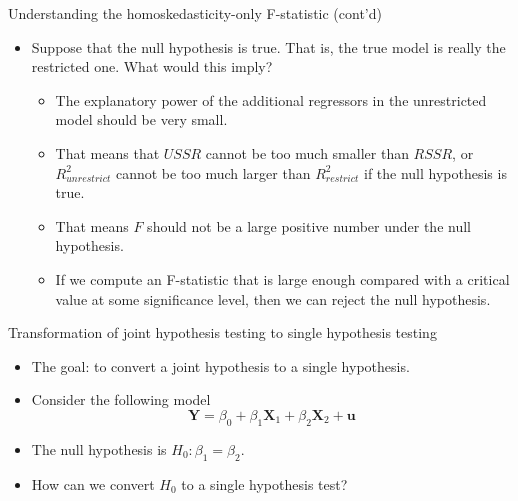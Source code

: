 \documentclass[presentation,10pt]{beamer}
\begin{document}
\begin{frame}[label={sec:org6815421}]{Understanding the homoskedasticity-only F-statistic (cont'd)}
\begin{itemize}
\item Suppose that the null hypothesis is true. That is, the
true model is really the restricted one. What would this imply?

\begin{itemize}
\item The explanatory power of the additional regressors in the
unrestricted model should be very small.

\vspace{0.2cm}

\item That means that \(USSR\) cannot be too much smaller than \(RSSR\), or
\(R^2_{unrestrict}\) cannot be too much larger than \(R^2_{restrict}\)
if the null hypothesis is true.

\vspace{0.2cm}

\item That means \(F\) should not be a large positive number under the null
hypothesis.

\vspace{0.2cm}

\item If we compute an F-statistic that is large enough compared with a
critical value at some significance level, then we can reject the
null hypothesis.
\end{itemize}
\end{itemize}
\end{frame}

\begin{frame}[label={sec:orgc441e22}]{Transformation of joint hypothesis testing to single hypothesis testing}
\begin{itemize}
\item The goal: to convert a joint hypothesis to a single hypothesis.

\item Consider the following model
\[ \mathbf{Y} = \beta_0 + \beta_1 \mathbf{X}_1 + \beta_2
  \mathbf{X}_2 + \mathbf{u} \]

\item The null hypothesis is \(H_0: \beta_1 = \beta_2\).

\item How can we convert \(H_0\) to a single hypothesis test?
\end{itemize}
\end{frame}
\end{document}
